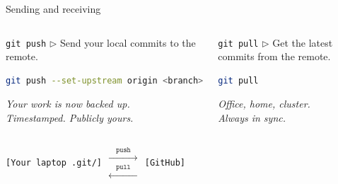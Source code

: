 \documentclass[aspectratio=169]{beamer}
\begin{document}

\begin{frame}[fragile]{Sending and receiving}
    \begin{columns}
            \begin{block}{\texttt{git push} $\triangleright$}
                Send your local commits to the remote.\\[4pt]
                \begin{lstlisting}[language=bash]
git push --set-upstream origin <branch>
                \end{lstlisting}
\textit{Your work is now backed up.\\
                Timestamped. Publicly yours.}
            \end{block}
            \pause
            \begin{block}{\texttt{git pull} $\triangleright$}
                Get the latest commits from the remote.\\[4pt]
                \begin{lstlisting}[language=bash]
git pull
                \end{lstlisting}
                \textit{Office, home, cluster.\\
                Always in sync.}
            \end{block}
    \end{columns}
    \vspace{0.8em}
    \pause
    \centering
    \texttt{[Your laptop \;\; .git/]}
    \quad
    $\begin{array}{c}
        \xrightarrow{\quad\texttt{push}\quad}\\[-4pt]
        \xleftarrow{\quad\texttt{pull}\quad}
    \end{array}$
    \quad
    \texttt{[GitHub]}
\end{frame}

\end{document}
